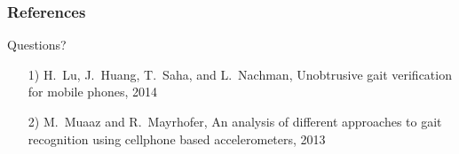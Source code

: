 \documentclass{beamer}
\newcommand{\linespace}{\vskip 0.25cm}
\begin{document}
\begin{frame} 
	\frametitle{References} 
	
	\begin{center}
		{\LARGE Questions?}
	\end{center}
	
\begin{itemize}
\item[1)]H.~Lu, J.~Huang, T.~Saha, and L.~Nachman, Unobtrusive gait verification for mobile phones, 2014

\item[2)] M.~Muaaz and R.~Mayrhofer, An analysis of different approaches to gait recognition using cellphone based accelerometers, 2013

\end{itemize}
%	
%	
%  
%	
\end{frame} 
\end{document}
